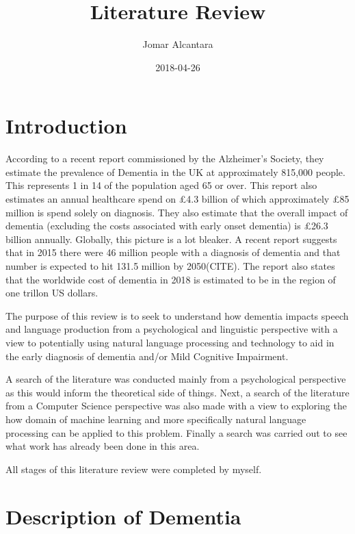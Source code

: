 \documentclass[a4paper]{article}
\title{Literature Review}
\date{2018-04-26}
\author{Jomar Alcantara}
\begin{document}
\maketitle
\newpage
\tableofcontents
\newpage

\section{Introduction}

\par
According to a recent report commissioned by the Alzheimer's Society, they estimate the prevalence of Dementia in the UK at approximately 815,000 people. This represents 1 in 14 of the population aged 65 or over. This report also estimates an annual healthcare spend on £4.3 billion of which approximately £85 million is spend solely on diagnosis. They also estimate that the overall impact of dementia (excluding the costs associated with early onset dementia) is £26.3 billion annually. Globally, this picture is a lot bleaker. A recent report suggests that in 2015 there were 46 million people with a diagnosis of dementia and that number is expected to hit 131.5 million by 2050(CITE). The report also states that the worldwide cost of dementia in 2018 is estimated to be in the region of one trillon US dollars.
\newline
\par
The purpose of this review is to seek to understand how dementia impacts speech and language production from a psychological and linguistic perspective with a view to potentially using natural language processing and technology to aid in the early diagnosis of dementia and/or Mild Cognitive Impairment.
\newline
\par
A search of the literature was conducted mainly from a psychological perspective as this would inform the theoretical side of things. Next, a search of the literature from a Computer Science perspective was also made with a view to exploring the how domain of machine learning and more specifically natural language processing can be applied to this problem. Finally a search was carried out to see what work has already been done in this area.

All stages of this literature review were completed by myself. 

\section{Description of Dementia}
\end{document}
